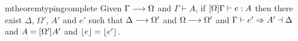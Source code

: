 
\begin{restatable}{mtheorem}{typingcomplete}  \label{thm:type_complete}
  Given $\Gamma \longrightarrow \Omega$ and $\Gamma \vdash A $, if
  $[\Omega]\Gamma \vdash e : A$ then there exist $\Delta$,
  $\Omega'$, $A'$ and $e'$ such that $\Delta \longrightarrow \Omega'$ and $\Omega \longrightarrow \Omega'$
  and $\Gamma \vdash e' \Rightarrow A' \dashv \Delta$ and $A = [\Omega']A'$ and $\lfloor{e}\rfloor = \lfloor{e'}\rfloor$.
\end{restatable}





